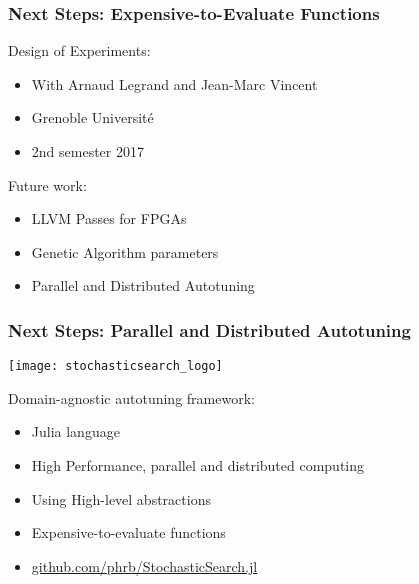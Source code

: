 \documentclass[10pt, compress, aspectratio=169]{beamer}
\begin{document}
\begin{frame}
    \frametitle{Next Steps: Expensive-to-Evaluate Functions}
    \alert{Design of Experiments}:
    \begin{itemize}
        \item With Arnaud Legrand and Jean-Marc Vincent
        \item Grenoble Université
        \item 2nd semester 2017
    \end{itemize}

    Future work:
    \begin{itemize}
        \item LLVM Passes for FPGAs
        \item Genetic Algorithm parameters
        \item Parallel and Distributed Autotuning
    \end{itemize}
\end{frame}

\begin{frame}
    \frametitle{Next Steps: Parallel and Distributed Autotuning}
    \begin{center}
        \texttt{[image: stochasticsearch\_logo]}
    \end{center}

    Domain-agnostic autotuning framework:
    \begin{itemize}
        \item \alert{Julia} language
        \item \alert{High Performance}, \alert{parallel and distributed computing}
        \item Using \alert{High-level abstractions}
        \item \alert{Expensive-to-evaluate} functions
        \item \url{github.com/phrb/StochasticSearch.jl}
    \end{itemize}
\end{frame}

\maketitle
\end{document}
